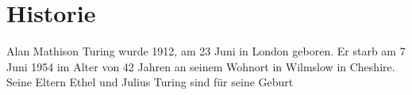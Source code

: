 \section{Historie}
Alan Mathison Turing wurde 1912, am 23 Juni in London geboren. Er starb am 7 Juni 1954 im Alter von 42 Jahren an seinem Wohnort in Wilmslow in Cheshire.
Seine Eltern Ethel und Julius Turing sind für seine Geburt  